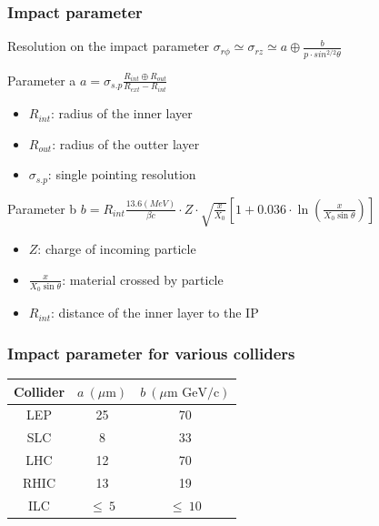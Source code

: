 \documentclass{beamer}
\begin{document}
  \begin{frame}[plain]
    \frametitle{Impact parameter}

    \begin{block}{Resolution on the impact parameter}
      \centering
      $\sigma_{r\phi} \simeq \sigma_{rz} \simeq a \oplus \frac{b}{p \cdot sin^{2/2} \theta}$
    \end{block}
    
    \begin{block}{Parameter a}
      \centering
      $ a = \sigma_{s.p} \frac{R_{int} \oplus R_{out}}{R_{ext}-R_{int}}$
      \begin{itemize}
        \item $R_{int}$: radius of the inner layer
        \item $R_{out}$: radius of the outter layer
        \item $\sigma_{s.p}$: single pointing resolution
      \end{itemize}
    \end{block}
    \begin{block}{Parameter b}
      \centering
      $ b = R_{int}\frac{13.6(MeV)}{\beta c}\cdot Z \cdot \sqrt{\frac{x}{X_0}} \left[ 1 + 0.036 \cdot \ln{\left( \frac{x}{X_0 \sin{\theta}}\right)} \right]$
      \begin{itemize}
        \item $Z$: charge of incoming particle
        \item $\frac{x}{X_0 \sin{\theta}}$: material crossed by particle
        \item $R_{int}$: distance of the inner layer to the IP
      \end{itemize}
    \end{block}

  \end{frame}


  \begin{frame}[plain]
    \frametitle{Impact parameter for various colliders}

    \centering
    \begin{tabular}{c c c}
    \hline
    Collider & $a~(\mu\text{m})$ & $b~(\mu\text{m GeV/c})$ \tabularnewline
    \hline
    \hline
    LEP & 25 & 70 \tabularnewline
    SLC & 8 & 33 \tabularnewline
    LHC & 12 & 70 \tabularnewline
    RHIC & 13 & 19 \tabularnewline
    ILC & $\leq~5$ & $\leq~10$ \tabularnewline
    \hline
    \end{tabular}
  \end{frame}
\end{document}
